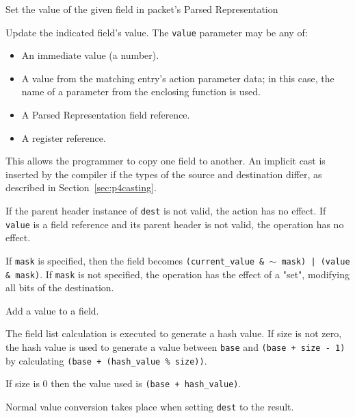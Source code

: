 \documentclass[12pt]{article}
\begin{document}
{ %
Set the value of the given field in packet's Parsed Representation
}
{ %
}
{ %
Update the indicated field's value. The \texttt{value} parameter may be any of:

\begin{itemize}
\item
An immediate value (a number).
\item
A value from the matching entry's action parameter data; in this case, the 
name of a parameter from the enclosing function is used.
\item
A Parsed Representation field reference.
\item
A register reference.
\end{itemize}


This allows the programmer to copy one field to another.  An implicit
cast is inserted by the compiler if the types of the source and
destination differ, as described in Section~\ref{sec:p4casting}.

If the parent header instance of \texttt{dest} is not valid, the action has no effect. 
If \texttt{value} is a field reference and its parent header is not valid, the operation 
has no effect.

If \texttt{mask} is specified, then the field becomes \texttt{(current_value \& $\sim$ mask) | 
(value \& mask)}.  If \texttt{mask} is not specified, the operation has the effect 
of a "set", modifying all bits of the destination.

}


{ %
Add a value to a field.
}
{ %
}
{ %
The field list calculation is executed to generate a hash value.  If size 
is not zero, the hash value is used to generate a value between \texttt{base} and 
\texttt{(base + size - 1)} by calculating \texttt{(base + (hash_value \% size))}.  

If size is 0 then the value used is \texttt{(base + hash_value)}.

Normal value conversion takes place when setting \texttt{dest} to the result.
}
\end{document}
